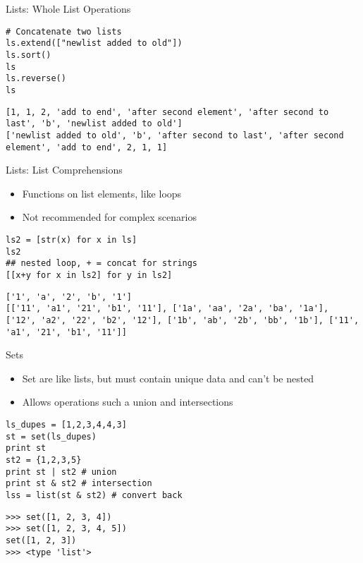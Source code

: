 \documentclass[presentation]{beamer}
\begin{document}
\begin{frame}[fragile,label=sec-4-1-9]{Lists: Whole List Operations}
 \lstset{numbers=left,language=Python,label= ,caption= }
\begin{lstlisting}
# Concatenate two lists
ls.extend(["newlist added to old"])
ls.sort()
ls
ls.reverse()
ls
\end{lstlisting}

\lstset{numbers=left,language=Python,label= ,caption= }
\begin{lstlisting}
[1, 1, 2, 'add to end', 'after second element', 'after second to last', 'b', 'newlist added to old']
['newlist added to old', 'b', 'after second to last', 'after second element', 'add to end', 2, 1, 1]
\end{lstlisting}
\end{frame}


\begin{frame}[fragile,label=sec-4-1-10]{Lists: List Comprehensions}
 \begin{itemize}
\item Functions on list elements, like loops
\item Not recommended for complex scenarios
\end{itemize}

\lstset{numbers=left,language=Python,label= ,caption= }
\begin{lstlisting}
ls2 = [str(x) for x in ls]
ls2
## nested loop, + = concat for strings
[[x+y for x in ls2] for y in ls2]
\end{lstlisting}

\lstset{numbers=left,language=Python,label= ,caption= }
\begin{lstlisting}
['1', 'a', '2', 'b', '1']
[['11', 'a1', '21', 'b1', '11'], ['1a', 'aa', '2a', 'ba', '1a'], ['12', 'a2', '22', 'b2', '12'], ['1b', 'ab', '2b', 'bb', '1b'], ['11', 'a1', '21', 'b1', '11']]
\end{lstlisting}
\end{frame}


\begin{frame}[fragile,label=sec-4-1-11]{Sets}
 \begin{itemize}
\item Set are like lists, but must contain unique data and can't be nested
\item Allows operations such a union and intersections
\end{itemize}

\lstset{numbers=left,language=Python,label= ,caption= }
\begin{lstlisting}
ls_dupes = [1,2,3,4,4,3]
st = set(ls_dupes)
print st
st2 = {1,2,3,5}
print st | st2 # union
print st & st2 # intersection
lss = list(st & st2) # convert back
\end{lstlisting}

\lstset{numbers=left,language=Python,label= ,caption= }
\begin{lstlisting}
>>> set([1, 2, 3, 4])
>>> set([1, 2, 3, 4, 5])
set([1, 2, 3])
>>> <type 'list'>
\end{lstlisting}
\end{frame}
\end{document}
